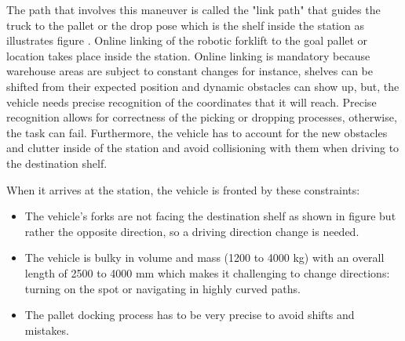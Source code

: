 The path that involves this maneuver is called the "link path" that guides the truck to the pallet or the drop 
pose which is the shelf inside the station as illustrates figure . Online linking of the robotic 
forklift to the goal pallet or location takes place inside
the station. Online linking is mandatory because warehouse areas are subject to constant changes for instance,
shelves can be shifted from their expected
position and dynamic obstacles can show up, but, the vehicle needs precise recognition of the coordinates 
that it will reach. 
Precise recognition allows for correctness of the picking or dropping processes, otherwise, 
the task can fail. Furthermore, the vehicle has to account for the new obstacles and clutter inside 
of the station and avoid collisioning with them when driving to the destination shelf.

When it arrives at the station, the vehicle is fronted by these constraints:
\begin{itemize}
    \item The vehicle’s forks are not facing the destination shelf as shown in figure  
    but rather the opposite direction, 
    so a driving direction change is needed. 

    \item The vehicle is bulky in volume and mass (1200 to 4000 kg) with an overall 
    length of 2500 to 4000 mm  \cite{R5}
    which makes it challenging  to change directions: turning on the spot or 
    navigating in highly curved paths. 
    
    \item The pallet docking process has to be very precise to avoid shifts and mistakes. 
\end{itemize}


